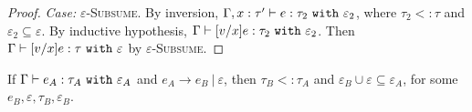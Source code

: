 \begin{proof}
\textit{Case:} \textsc{$\varepsilon$-Subsume}. By inversion, $ \Gamma, x:  \tau' \vdash  e:  \tau_2~\mathtt{with}~ \varepsilon_2$, where $ \tau_2 <:  \tau$ and $\varepsilon_2 \subseteq \varepsilon$. By inductive hypothesis, $ \Gamma \vdash [ v/x] e:  \tau_2~\mathtt{with}~ \varepsilon_2$. Then $ \Gamma \vdash [ v/x] e:  \tau~\mathtt{with}~ \varepsilon$ by \textsc{$\varepsilon$-Subsume}.

\end{proof}


\hrulefill


\begin{theorem}
If $\Gamma \vdash e_A: \tau_A~\mathtt{with}~ \varepsilon_A$ and $e_A \longrightarrow e_B~|~\varepsilon$, then $\tau_B <: \tau_A$ and $\varepsilon_B \cup \varepsilon \subseteq \varepsilon_A$, for some $e_B, \varepsilon, \tau_B, \varepsilon_B$.
\end{theorem}


